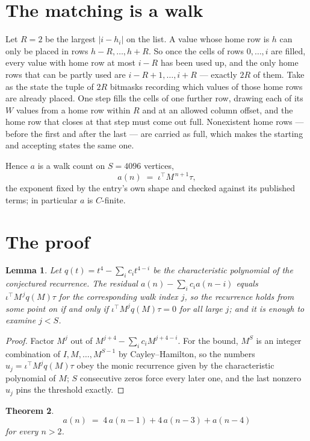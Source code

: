 \documentclass[11pt,a4paper]{article}
\theoremstyle{plain}
\newtheorem{theorem}{Theorem}
\newtheorem{lemma}[theorem]{Lemma}
\theoremstyle{definition}
\begin{document}
\section{The matching is a walk}

Let $R=2$ be the largest $|i-h_i|$ on the list. A value whose home row is $h$ can only be
placed in rows $h-R,\dots,h+R$. So once the cells of rows $0,\dots,i$ are filled, every
value with home row at most $i-R$ has been used up, and the only home rows that can be
partly used are $i-R+1,\dots,i+R$ --- exactly $2R$ of them. Take as the state the tuple of
$2R$ bitmasks recording which values of those home rows are already placed. One step fills
the cells of one further row, drawing each of its $W$ values from a home row within $R$
and at an allowed column offset, and the home row that closes at that step must come out
full. Nonexistent home rows --- before the first and after the last --- are carried as
full, which makes the starting and accepting states the same one.

Hence $a$ is a walk count on $S=4096$ vertices,
\[
a(n)\;=\;\iota^{\!\top}M^{\,n+1}\tau ,
\]
the exponent fixed by the entry's own shape and checked against its published terms; in
particular $a$ is $C$-finite.

\section{The proof}

\begin{lemma}\label{lem:crit}
Let $q(t)=t^{4}-\sum_i c_it^{4-i}$ be the characteristic polynomial of the
conjectured recurrence. The residual $a(n)-\sum_ic_ia(n-i)$ equals
$\iota^{\!\top}M^{\,j}q(M)\tau$ for the corresponding walk index $j$, so the recurrence
holds from some point on if and only if $\iota^{\!\top}M^{j}q(M)\tau=0$ for all large $j$;
and it is enough to examine $j<S$.
\end{lemma}

\begin{proof}
Factor $M^{j}$ out of $M^{j+4}-\sum_ic_iM^{j+4-i}$. For the bound, $M^{S}$
is an integer combination of $I,M,\dots,M^{S-1}$ by Cayley--Hamilton, so the numbers
$u_j=\iota^{\!\top}M^{j}q(M)\tau$ obey the monic recurrence given by the characteristic
polynomial of $M$; $S$ consecutive zeros force every later one, and the last nonzero $u_j$
pins the threshold exactly.
\end{proof}

\begin{theorem}
\[
a(n)\;=\;4\,a(n-1) + 4\,a(n-3) + a(n-4)
\]
for every $n>2$.
\end{theorem}
\end{document}

